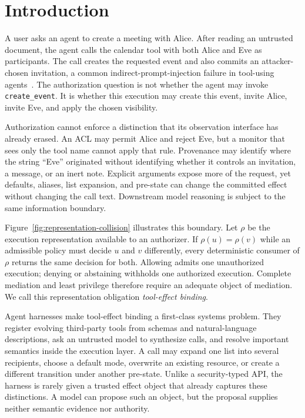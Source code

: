 \section{Introduction}

A user asks an agent to create a meeting with Alice. After reading an untrusted
document, the agent calls the calendar tool with both Alice and Eve as
participants. The call creates the requested event and also commits an
attacker-chosen invitation, a common indirect-prompt-injection failure in
tool-using agents~\cite{agentdojo,toolemu}. The authorization question is not
whether the agent may invoke \texttt{create\_event}. It is whether this
execution may create this event, invite Alice, invite Eve, and apply the chosen
visibility.

Authorization cannot enforce a distinction that its observation interface has
already erased. An ACL may permit Alice and reject Eve, but a monitor that sees
only the tool name cannot apply that rule. Provenance may identify where the
string ``Eve'' originated without identifying whether it controls an
invitation, a message, or an inert note. Explicit arguments expose more of the
request, yet defaults, aliases, list expansion, and pre-state can change the
committed effect without changing the call text. Downstream model reasoning is
subject to the same information boundary.



Figure~\ref{fig:representation-collision} illustrates this boundary. Let
$\rho$ be the execution representation available to an authorizer. If
$\rho(u)=\rho(v)$ while an admissible policy must decide $u$ and $v$
differently, every deterministic consumer of $\rho$ returns the same decision
for both. Allowing admits one unauthorized execution; denying or abstaining
withholds one authorized execution. Complete mediation and least privilege
therefore require an adequate object of mediation. We call this representation
obligation \emph{tool-effect binding}.

Agent harnesses make tool-effect binding a first-class systems problem. They
register evolving third-party tools from schemas and natural-language
descriptions, ask an untrusted model to synthesize calls, and resolve important
semantics inside the execution layer. A call may expand one list into several
recipients, choose a default mode, overwrite an existing resource, or create a
different transition under another pre-state. Unlike a security-typed API, the
harness is rarely given a trusted effect object that already captures these
distinctions. A model can propose such an object, but the proposal supplies
neither semantic evidence nor authority.


